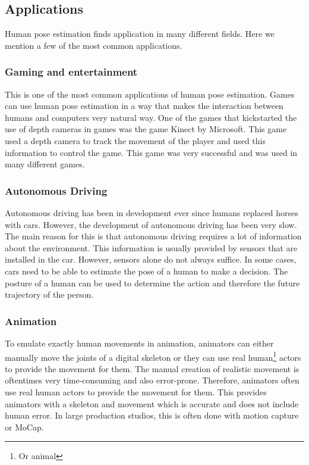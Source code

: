 \subsection{Applications}

Human pose estimation finds application in many different fields. Here we mention a few of the most common applications.

\subsubsection{Gaming and entertainment}

This is one of the most common applications of human pose estimation. Games can use human pose estimation in a way that makes the interaction between humans and computers very natural way. One of the games that kickstarted the use of depth cameras in games was the game Kinect by Microsoft. This game used a depth camera to track the movement of the player and used this information to control the game. This game was very successful and was used in many different games. 

\subsubsection{Autonomous Driving}

Autonomous driving has been in development ever since humans replaced horses with cars. However, the development of autonomous driving has been very slow. The main reason for this is that autonomous driving requires a lot of information about the environment. This information is usually provided by sensors that are installed in the car. However, sensors alone do not always suffice. In some cases, cars need to be able to estimate the pose of a human to make a decision. The posture of a human can be used to determine the action and therefore the future trajectory of the person. 

\subsubsection{Animation}

To emulate exactly human movements in animation, animators can either manually move the joints of a digital skeleton or they can use real human\footnote{Or animal} actors to provide the movement for them. The manual creation of realistic movement is oftentimes very time-consuming and also error-prone. Therefore, animators often use real human actors to provide the movement for them. This provides animators with a skeleton and movement which is accurate and does not include human error. In large production studios, this is often done with motion capture or MoCap. 

